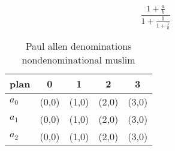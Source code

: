 \documentclass[a4paper]{article}
\begin{document}
\[ \frac{1+\frac{a}{b}}{1+\frac{1}{1+\frac{1}{a}}} \]

\begin{table}
\begin{adjustbox}{width=0.6\columnwidth}
\begin{tabular}{|l|l|l|l|l|}
\hline
\textbf{plan} & \multicolumn{1}{c|}{\textbf{0}} & \multicolumn{1}{c|}{\textbf{1}} & \multicolumn{1}{c|}{\textbf{2}} & \multicolumn{1}{c|}{\textbf{3}} \\ \hline
\textbf{$a_0$}  & (0,0) & (1,0) & (2,0) & (3,0) \\ \hline
\textbf{$a_1$}  & (0,0) & (1,0) & (2,0) & (3,0) \\ \hline
\textbf{$a_2$}  & (0,0) & (1,0) & (2,0) & (3,0) \\ \hline
\end{tabular}
\end{adjustbox}
\caption{Paul allen denominations nondenominational muslim
}
\end{table}
\end{document}
